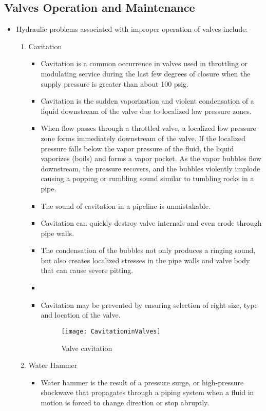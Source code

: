 \subsection{Valves Operation and Maintenance} 
\begin{itemize}
\item Hydraulic problems associated with improper operation of valves include:
\begin{enumerate}
\item Cavitation 
\begin{itemize}
\item Cavitation is a common occurrence in valves used in throttling or modulating service during the last few degrees of closure when the supply pressure is greater than about 100 psig. 
\item Cavitation is the sudden vaporization and violent condensation of a liquid downstream of the valve due to localized low pressure zones. 
\item When flow passes through a throttled valve, a localized low pressure zone forms immediately downstream of the valve. If the localized pressure falls below the vapor pressure of the fluid, the liquid vaporizes (boils) and forms a vapor pocket. As the vapor bubbles flow downstream, the pressure
recovers, and the bubbles violently implode causing a popping or rumbling sound similar to tumbling rocks in a pipe. 
\item The sound of cavitation in a pipeline is unmistakable. 
\item Cavitation can quickly destroy valve internals and even erode through pipe walls.
\item The condensation of the bubbles not only produces a ringing sound, but also creates localized stresses in the pipe walls and valve body that can cause severe pitting.
\item 
\item Cavitation may be prevented by ensuring selection of right size, type and location of the valve.
\begin{figure}[H]
\begin{center}
\texttt{[image: CavitationinValves]}
\caption{Valve cavitation}
\end{center}
\end{figure}
\end{itemize}
\item Water Hammer 
\begin{itemize}
\item Water hammer is the result of a pressure surge, or high-pressure shockwave that propagates through a piping system when a fluid in motion is forced to change direction or stop abruptly. 

\end{itemize}
\end{enumerate}
\end{itemize}

